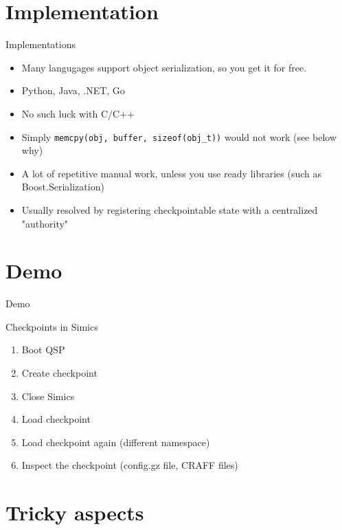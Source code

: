 \section{Implementation}

\begin{frame}{Implementations}
\begin{itemize}
\item Many langugages support object serialization, so you get it for free.
\item Python, Java, .NET, Go\pause
\item No such luck with C/C++
\item Simply \texttt{memcpy(obj, buffer, sizeof(obj_t))} would not work (see below why)
\item A lot of repetitive manual work, unless you use ready libraries (such as Boost.Serialization)
\item Usually resolved by registering checkpointable state with a centralized "authority"
\end{itemize}

\end{frame}

\section{Demo}

\begin{frame}{Demo}

Checkpoints in Simics

\begin{enumerate}
    \item Boot QSP
    \item Create checkpoint
    \item Close Simics
    \item Load checkpoint
    \item Load checkpoint again (different namespace)
    \item Inspect the checkpoint (config.gz file, CRAFF files)
\end{enumerate}

\end{frame}



\section{Tricky aspects}

